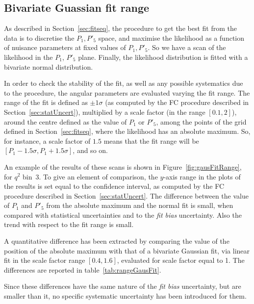 \subsection{Bivariate Guassian fit range}\label{sec:bestFit}

As described in Section~\ref{sec:fitseq}, the procedure to get the best fit from the data is to discretise the $P_1,P'_5$ space, and maximise the likelihood as a function of nuisance parameters at fixed values of $P_1,P'_5$.
So we have a scan of the likelihood in the $P_1$, $P'_5$ plane.
Finally, the likelihood distribution is fitted with a bivariate normal distribution.

In order to check the stability of the fit, as well as any possible systematics due to the procedure, the angular parameters are evaluated varying the fit range.
The range of the fit is defined as $\pm1\sigma$ (as computed by the FC procedure described in Section~\ref{sec:statUncert}), multiplied by a scale factor (in the range $[0.1,2]$), around the centre defined as the value of $P_1$ or $P'_5$, among the points of the grid defined in Section~\ref{sec:fitseq}, where the likelihood has an absolute maximum.
So, for instance, a scale factor of $1.5$ means that the fit range will be $[P_1-1.5\sigma,P_1+1.5\sigma]$, and so on.

An example of the results of these scans is shown in Figure~\ref{fig:gausFitRange}, for $q^2$ bin~3.
To give an element of comparison, the $y$-axis range in the plots of the results is set equal to the confidence interval, as computed by the FC procedure described in Section~\ref{sec:statUncert}. 
The difference between the value of $P_1$ and $P'_5$ from the absolute maximum and the normal fit is small, when compared with statistical uncertainties and to the \textit{fit bias} uncertainty.
Also the trend with respect to the fit range is small.

A quantitative difference has been extracted by comparing the value of the position of the absolute maximum with that of a bivariate Gaussian fit, via linear fit in the scale factor range $[0.4,1.6]$, evaluated for scale factor equal to 1.
The differences are reported in table~\ref{tab:rangeGausFit}.

Since these differences have the same nature of the \textit{fit bias} uncertainty, but are smaller than it, no specific systematic uncertainty has been introduced for them. 

